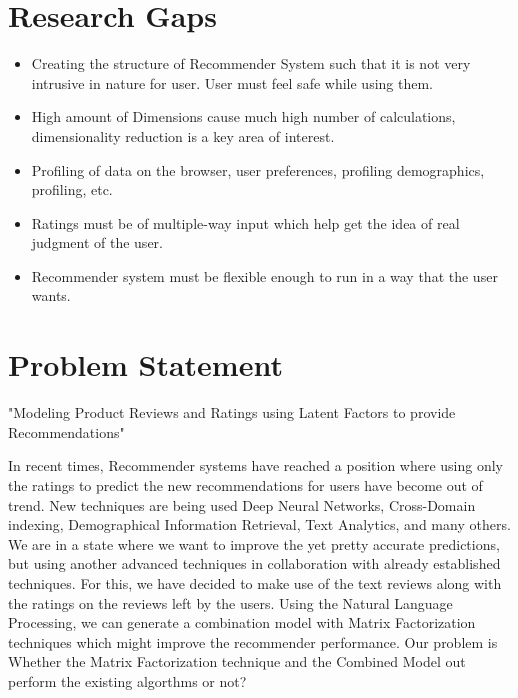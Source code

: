\section{Research Gaps}
\begin{itemize}
\item Creating the structure of Recommender System such that it is not very intrusive in
nature for user. User must feel safe while using them.
\item High amount of Dimensions cause much high number of calculations, dimensionality
reduction is a key area of interest.
\item Profiling of data on the browser, user preferences, profiling demographics, profiling,
etc.
\item Ratings must be of multiple-way input which help get the idea of real judgment of
the user.
\item Recommender system must be flexible enough to run in a way that the user wants.
\end{itemize}

\section{Problem Statement}

"Modeling Product Reviews and Ratings using Latent Factors to provide Recommendations"

In recent times, Recommender systems have reached a position where using only the ratings to predict the new recommendations for users have become out of trend. New techniques are being used Deep Neural Networks, Cross-Domain indexing, Demographical Information Retrieval, Text Analytics, and many others. We are in a state where we want to improve the yet pretty accurate predictions, but using another advanced techniques in collaboration with already established techniques. For this, we have decided to make use of the text reviews along with the ratings on the reviews left by the users. Using the Natural Language Processing, we can generate a combination model with Matrix Factorization techniques which might improve the recommender performance. Our problem is Whether the Matrix Factorization technique and the Combined Model out perform the existing algorthms or not?



